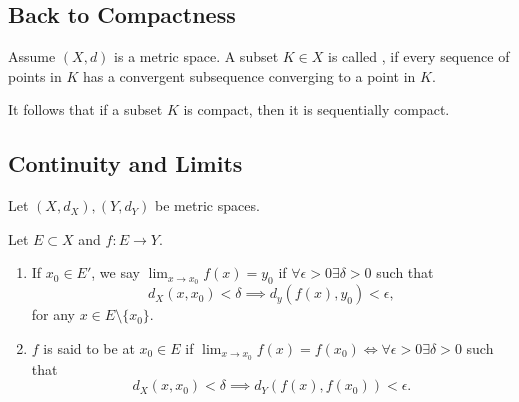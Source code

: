 \documentclass{book}
\begin{document}
\subsection{Back to Compactness}
\begin{defn}
    Assume $(X, d)$ is a metric space. A subset $K \in X$ is called , if every sequence of points in $K$ has a convergent subsequence converging to a point in $K$.
\end{defn}

It follows that if a subset $K$ is compact, then it is sequentially compact.

\subsection{Continuity and Limits}
Let $(X, d_X), (Y, d_Y)$ be metric spaces. 

\begin{defn}
    Let $E \subset X$ and $f: E \to Y$.
    \begin{enumerate}
        \item If $x_0 \in E'$, we say $\lim_{x \to x_0} f(x) = y_0$ if $\forall \epsilon > 0 \exists \delta > 0$ such that \[d_X(x, x_0) < \delta \implies d_y(f(x), y_0) < \epsilon,\] for any $x \in E \setminus \{x_0\}$.
        \item $f$ is said to be  at $x_0 \in E$ if $\lim_{x \to x_0} f(x) = f(x_0) \iff \forall \epsilon > 0 \exists \delta > 0$ such that \[d_X(x, x_0) < \delta \implies d_Y(f(x), f(x_0)) < \epsilon.\] 
    \end{enumerate}
\end{defn}
\end{document}
